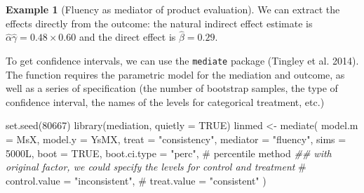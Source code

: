 \documentclass[
  11pt,
  letterpaper,
]{scrbook}
\newenvironment{Shaded}{\begin{snugshade}}{\end{snugshade}}
\newcommand{\AttributeTok}[1]{\textcolor[rgb]{0.40,0.45,0.13}{#1}}
\newcommand{\CommentTok}[1]{\textcolor[rgb]{0.37,0.37,0.37}{#1}}
\newcommand{\ConstantTok}[1]{\textcolor[rgb]{0.56,0.35,0.01}{#1}}
\newcommand{\DecValTok}[1]{\textcolor[rgb]{0.68,0.00,0.00}{#1}}
\newcommand{\DocumentationTok}[1]{\textcolor[rgb]{0.37,0.37,0.37}{\textit{#1}}}
\newcommand{\FunctionTok}[1]{\textcolor[rgb]{0.28,0.35,0.67}{#1}}
\newcommand{\NormalTok}[1]{\textcolor[rgb]{0.00,0.23,0.31}{#1}}
\newcommand{\OtherTok}[1]{\textcolor[rgb]{0.00,0.23,0.31}{#1}}
\newcommand{\StringTok}[1]{\textcolor[rgb]{0.13,0.47,0.30}{#1}}
\theoremstyle{definition}
\newtheorem{example}{Example}[chapter]
\theoremstyle{definition}
\theoremstyle{remark}
\begin{document}
\begin{example}[Fluency as mediator of product
evaluation]
\begin{table}
\begin{minipage}{0.50\linewidth}
{}

\end{minipage}%
%
\begin{minipage}{0.50\linewidth}



\end{minipage}%

\end{table}%

We can extract the effects directly from the outcome: the natural
indirect effect estimate is
\(\widehat{\alpha}\widehat{\gamma} = 0.48 \times 0.60\) and the direct
effect is \(\widehat{\beta} = 0.29\).

To get confidence intervals, we can use the \texttt{mediate} package
(Tingley et al. 2014). The function requires the parametric model for
the mediation and outcome, as well as a series of specification (the
number of bootstrap samples, the type of confidence interval, the names
of the levels for categorical treatment, etc.)

\begin{Shaded}
\begin{Highlighting}[]
\FunctionTok{set.seed}\NormalTok{(}\DecValTok{80667}\NormalTok{)}
\FunctionTok{library}\NormalTok{(mediation, }\AttributeTok{quietly =} \ConstantTok{TRUE}\NormalTok{)}
\NormalTok{linmed }\OtherTok{\textless{}{-}} \FunctionTok{mediate}\NormalTok{(}
  \AttributeTok{model.m =}\NormalTok{ MsX,}
  \AttributeTok{model.y =}\NormalTok{ YsMX,}
  \AttributeTok{treat =} \StringTok{"consistency"}\NormalTok{,}
  \AttributeTok{mediator =} \StringTok{"fluency"}\NormalTok{,}
  \AttributeTok{sims =} \DecValTok{5000}\NormalTok{L,}
  \AttributeTok{boot =} \ConstantTok{TRUE}\NormalTok{,}
  \AttributeTok{boot.ci.type =} \StringTok{"perc"}\NormalTok{, }\CommentTok{\# percentile method}
\DocumentationTok{\#\# with original factor, we could specify the levels for control and treatment}
\CommentTok{\#  control.value = "inconsistent", }
\CommentTok{\#  treat.value = "consistent"}
\NormalTok{)}
\end{Highlighting}
\end{Shaded}


\end{example}
\end{document}
